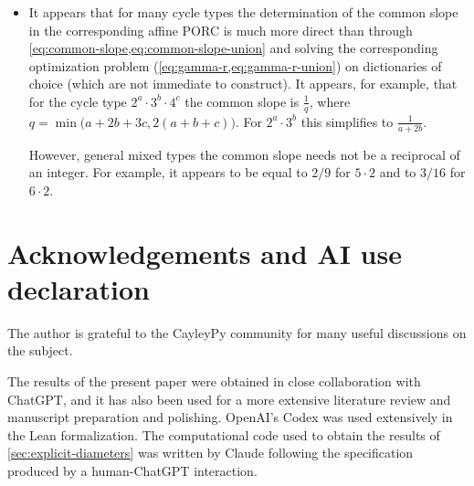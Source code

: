 \documentclass[DIV=12,10pt]{scrartcl}
\theoremstyle{definition}
\begin{document}
\begin{itemize}
\begin{itemize}
\end{itemize}
\item It appears that for many cycle types the determination of the common slope in the corresponding affine PORC is much more direct than through \cref{eq:common-slope,eq:common-slope-union} and solving the corresponding optimization problem (\cref{eq:gamma-r,eq:gamma-r-union}) on dictionaries of choice (which are not immediate to construct). It appears, for example, that for the cycle type $2^a{\cdot}3^b{\cdot}4^c$ the common slope is $\frac{1}{q}$, where $q=\min\big(a+2b+3c,2(a+b+c)\big)$. For $2^a{\cdot}3^b$ this simplifies to $\frac{1}{a+2b}$.

However, general mixed types the common slope needs not be a reciprocal of an integer. For example, it appears to be equal to $2/9$ for $5{\cdot}2$ and to $3/16$ for $6{\cdot}2$.
\end{itemize}

\section*{Acknowledgements and AI use declaration}
The author is grateful to the CayleyPy community for many useful discussions on the subject.

The results of the present paper were obtained in close collaboration with ChatGPT, and it has also been used for a more extensive literature review and manuscript preparation and polishing. OpenAI's Codex was used extensively in the Lean formalization. The computational code used to obtain the results of \cref{sec:explicit-diameters} was written by Claude following the specification produced by a human-ChatGPT interaction.





\clearpage
\end{document}
